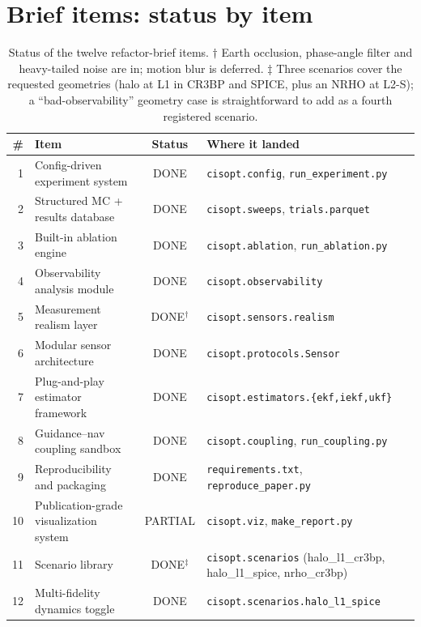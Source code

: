 \documentclass[11pt]{article}
\begin{document}
\section{Brief items: status by item}\label{sec:items}

\begin{table}[h]
\centering
\footnotesize
\begin{tabular}{rlcp{6.5cm}}
\toprule
\# & Item & Status & Where it landed \\
\midrule
1  & Config-driven experiment system          & DONE & \texttt{cisopt.config}, \texttt{run\_experiment.py} \\
2  & Structured MC + results database          & DONE & \texttt{cisopt.sweeps}, \texttt{trials.parquet} \\
3  & Built-in ablation engine                  & DONE & \texttt{cisopt.ablation}, \texttt{run\_ablation.py} \\
4  & Observability analysis module             & DONE & \texttt{cisopt.observability} \\
5  & Measurement realism layer                 & DONE$^\dagger$ & \texttt{cisopt.sensors.realism} \\
6  & Modular sensor architecture               & DONE & \texttt{cisopt.protocols.Sensor} \\
7  & Plug-and-play estimator framework         & DONE & \texttt{cisopt.estimators.\{ekf,iekf,ukf\}} \\
8  & Guidance--nav coupling sandbox            & DONE & \texttt{cisopt.coupling}, \texttt{run\_coupling.py} \\
9  & Reproducibility and packaging             & DONE & \texttt{requirements.txt}, \texttt{reproduce\_paper.py} \\
10 & Publication-grade visualization system    & PARTIAL & \texttt{cisopt.viz}, \texttt{make\_report.py} \\
11 & Scenario library                          & DONE$^\ddagger$ & \texttt{cisopt.scenarios} (halo\_l1\_cr3bp, halo\_l1\_spice, nrho\_cr3bp) \\
12 & Multi-fidelity dynamics toggle            & DONE & \texttt{cisopt.scenarios.halo\_l1\_spice} \\
\bottomrule
\end{tabular}
\caption{Status of the twelve refactor-brief items. $\dagger$ Earth occlusion,
phase-angle filter and heavy-tailed noise are in; motion blur is deferred.
$\ddagger$ Three scenarios cover the requested geometries (halo at L1 in
CR3BP and SPICE, plus an NRHO at L2-S); a ``bad-observability'' geometry case
is straightforward to add as a fourth registered scenario.}
\end{table}
\end{document}
